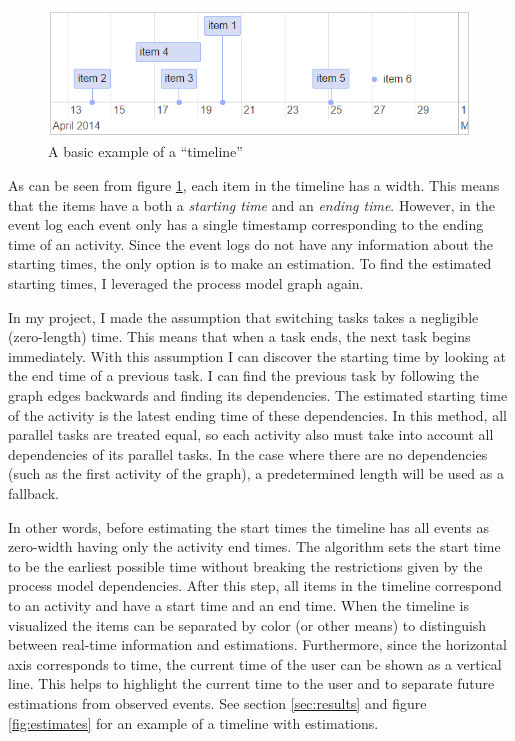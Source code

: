 \begin{figure}[htb]
    \centering \includegraphics[width=0.8\linewidth]{gfx/screenshots/basictimeline.png}
    \caption{A basic example of a ``timeline''}
    \label{fig:basictimeline}
\end{figure}

As can be seen from figure \ref{fig:basictimeline}, each item in the timeline has a width.
This means that the items have a both a \textit{starting time} and an \textit{ending time}.
However, in the event log each event only has a single timestamp corresponding to the ending time of an activity.
Since the event logs do not have any information about the starting times, the only option is to make an estimation.
To find the estimated starting times, I leveraged the process model graph again.

In my project, I made the assumption that switching tasks takes a negligible (zero-length) time.
This means that when a task ends, the next task begins immediately.
With this assumption I can discover the starting time by looking at the end time of a previous task.
I can find the previous task by following the graph edges backwards and finding its dependencies.
The estimated starting time of the activity is the latest ending time of these dependencies.
In this method, all parallel tasks are treated equal, so each activity also must take into account all dependencies of its parallel tasks.
In the case where there are no dependencies (such as the first activity of the graph), a predetermined length will be used as a fallback.

In other words, before estimating the start times the timeline has all events as zero-width having only the activity end times. The algorithm sets the start time to be the earliest possible time without breaking the restrictions given by the process model dependencies.
After this step, all items in the timeline correspond to an activity and have a start time and an end time.
When the timeline is visualized the items can be separated by color (or other means) to distinguish between real-time information and estimations.
Furthermore, since the horizontal axis corresponds to time, the current time of the user can be shown as a vertical line.
This helps to highlight the current time to the user and to separate future estimations from observed events.
See section \ref{sec:results} and figure \ref{fig:estimates} for an example of a timeline with estimations.

